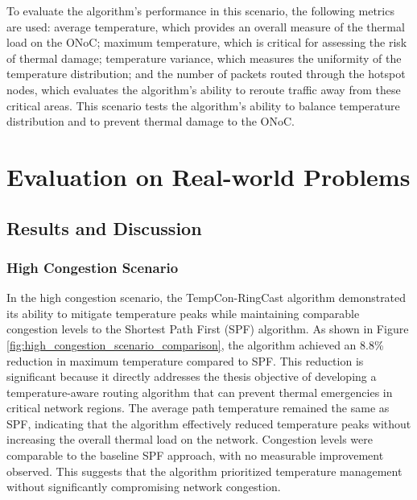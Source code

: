\documentclass[12pt]{article}
\begin{document}
To evaluate the algorithm's performance in this scenario, the following metrics are used: average temperature, which provides an overall measure of the thermal load on the ONoC; maximum temperature, which is critical for assessing the risk of thermal damage; temperature variance, which measures the uniformity of the temperature distribution; and the number of packets routed through the hotspot nodes, which evaluates the algorithm's ability to reroute traffic away from these critical areas. This scenario tests the algorithm's ability to balance temperature distribution and to prevent thermal damage to the ONoC.

\newpage

\chapter{Evaluation on Real-world Problems}

\section{Results and Discussion}

\subsection{High Congestion Scenario}
In the high congestion scenario, the TempCon-RingCast algorithm demonstrated its ability to mitigate temperature peaks while maintaining comparable congestion levels to the Shortest Path First (SPF) algorithm. As shown in Figure \ref{fig:high_congestion_scenario_comparison}, the algorithm achieved an 8.8\% reduction in maximum temperature compared to SPF. This reduction is significant because it directly addresses the thesis objective of developing a temperature-aware routing algorithm that can prevent thermal emergencies in critical network regions. The average path temperature remained the same as SPF, indicating that the algorithm effectively reduced temperature peaks without increasing the overall thermal load on the network. Congestion levels were comparable to the baseline SPF approach, with no measurable improvement observed. This suggests that the algorithm prioritized temperature management without significantly compromising network congestion.
\end{document}
